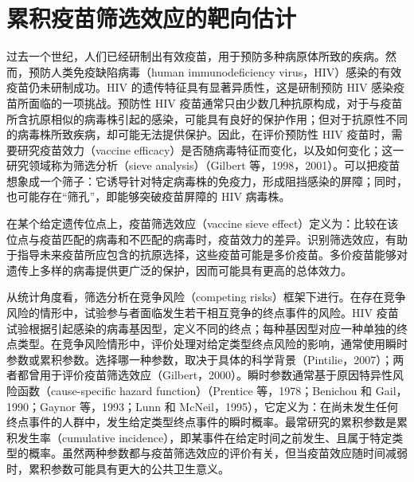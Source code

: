 \chapter{累积疫苗筛选效应的靶向估计}
\label{ch:cumulative-vaccine-sieve-effects}

过去一个世纪，人们已经研制出有效疫苗，用于预防多种病原体所致的疾病。然而，预防人类免疫缺陷病毒（human immunodeficiency virus，HIV）感染的有效疫苗仍未研制成功。HIV 的遗传特征具有显著异质性，这是研制预防 HIV 感染疫苗所面临的一项挑战。预防性 HIV 疫苗通常只由少数几种抗原构成，对于与疫苗所含抗原相似的病毒株引起的感染，可能具有良好的保护作用；但对于抗原性不同的病毒株所致疾病，却可能无法提供保护。因此，在评价预防性 HIV 疫苗时，需要研究疫苗效力（vaccine efficacy）是否随病毒特征而变化，以及如何变化；这一研究领域称为筛选分析（sieve analysis）（Gilbert 等，1998，2001）。可以把疫苗想象成一个筛子：它诱导针对特定病毒株的免疫力，形成阻挡感染的屏障；同时，也可能存在“筛孔”，即能够突破疫苗屏障的 HIV 病毒株。

\begin{sourcebox}
在某个给定遗传位点上，疫苗筛选效应（vaccine sieve effect）定义为：比较在该位点与疫苗匹配的病毒和不匹配的病毒时，疫苗效力的差异。识别筛选效应，有助于指导未来疫苗所应包含的抗原选择，这些疫苗可能是多价疫苗。多价疫苗能够对遗传上多样的病毒提供更广泛的保护，因而可能具有更高的总体效力。
\end{sourcebox}

从统计角度看，筛选分析在竞争风险（competing risks）框架下进行。在存在竞争风险的情形中，试验参与者面临发生若干相互竞争的终点事件的风险。HIV 疫苗试验根据引起感染的病毒基因型，定义不同的终点；每种基因型对应一种单独的终点类型。在竞争风险情形中，评价处理对给定类型终点风险的影响，通常使用瞬时参数或累积参数。选择哪一种参数，取决于具体的科学背景（Pintilie，2007）；两者都曾用于评价疫苗筛选效应（Gilbert，2000）。瞬时参数通常基于原因特异性风险函数（cause-specific hazard function）（Prentice 等，1978；Benichou 和 Gail，1990；Gaynor 等，1993；Lunn 和 McNeil，1995），它定义为：在尚未发生任何终点事件的人群中，发生给定类型终点事件的瞬时概率。最常研究的累积参数是累积发生率（cumulative incidence），即某事件在给定时间之前发生、且属于特定类型的概率。虽然两种参数都与疫苗筛选效应的评价有关，但当疫苗效应随时间减弱时，累积参数可能具有更大的公共卫生意义。

